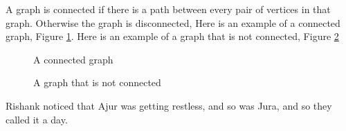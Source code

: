 \vspace{3in}
A graph is connected if there is a path between every pair of vertices in that graph. Otherwise the graph is disconnected,  Here is an example of a connected graph, Figure \ref{3g9}. Here is an example of a graph that is not connected, Figure \ref{3g10}
\begin{figure}
\begin{center}
\caption{ A connected graph}\label{3g9}
\end{center}
\end{figure}

\begin{figure}
\begin{center}
\caption{ A graph that is not connected}\label{3g10}
\end{center}
\end{figure}
\vspace{3in}
Rishank noticed that Ajur was getting restless, and so was Jura, and so they called it a day.